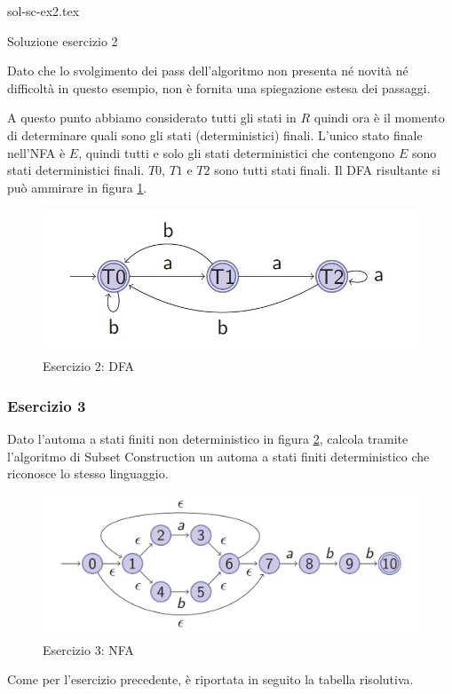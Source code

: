 \documentclass[class=book, crop=false, oneside, 12pt]{standalone}
\begin{document}
\begin{table}[H]
	\centering
	{sol-sc-ex2.tex}
    \caption{Soluzione esercizio 2}
    \label{sol-sc-ex2}
\end{table} 

Dato che lo svolgimento dei pass dell'algoritmo non presenta né novità né difficoltà in questo esempio, non è fornita una spiegazione estesa dei passaggi.

A questo punto abbiamo considerato tutti gli stati in \(R\) quindi ora è il momento di determinare quali sono gli stati (deterministici) finali. L’unico stato finale nell'NFA è \(E\), quindi tutti e solo gli stati deterministici che contengono \(E\) sono stati deterministici finali. \(T0\), \(T1\) e \(T2\) sono tutti stati finali. Il DFA risultante si può ammirare in figura \ref{sol_sc_2}.
\begin{figure}[H]
    \centering
    \includegraphics[width=.8\textwidth,keepaspectratio]{s2_subset_construction.jpg}
    \caption{Esercizio 2: DFA}
    \label{sol_sc_2}
\end{figure}

\subsubsection*{Esercizio 3}
Dato l'automa a stati finiti non deterministico in figura \ref{es_sc_3}, calcola tramite l'algoritmo di Subset Construction un automa a stati finiti deterministico che riconosce lo stesso linguaggio.
\begin{figure}[H]
    \centering
    \includegraphics[width=.8\textwidth,keepaspectratio]{e3_subset_construction.jpg}
    \caption{Esercizio 3: NFA}
    \label{es_sc_3}
\end{figure}
Come per l'esercizio precedente, è riportata in seguito la tabella risolutiva.\\
\end{document}
